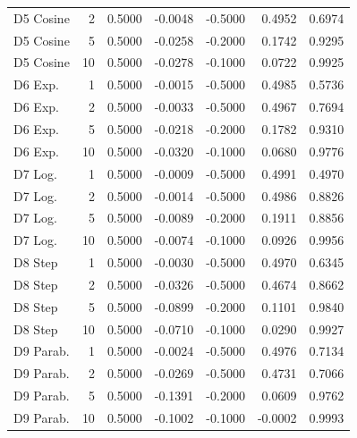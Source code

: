 \begin{tabular}{lrrrrrr}
   D5 Cosine &    2 & 0.5000 &    -0.0048 &       -0.5000 &      0.4952 & 0.6974 \\
   D5 Cosine &    5 & 0.5000 &    -0.0258 &       -0.2000 &      0.1742 & 0.9295 \\
   D5 Cosine &   10 & 0.5000 &    -0.0278 &       -0.1000 &      0.0722 & 0.9925 \\
     D6 Exp. &    1 & 0.5000 &    -0.0015 &       -0.5000 &      0.4985 & 0.5736 \\
     D6 Exp. &    2 & 0.5000 &    -0.0033 &       -0.5000 &      0.4967 & 0.7694 \\
     D6 Exp. &    5 & 0.5000 &    -0.0218 &       -0.2000 &      0.1782 & 0.9310 \\
     D6 Exp. &   10 & 0.5000 &    -0.0320 &       -0.1000 &      0.0680 & 0.9776 \\
     D7 Log. &    1 & 0.5000 &    -0.0009 &       -0.5000 &      0.4991 & 0.4970 \\
     D7 Log. &    2 & 0.5000 &    -0.0014 &       -0.5000 &      0.4986 & 0.8826 \\
     D7 Log. &    5 & 0.5000 &    -0.0089 &       -0.2000 &      0.1911 & 0.8856 \\
     D7 Log. &   10 & 0.5000 &    -0.0074 &       -0.1000 &      0.0926 & 0.9956 \\
     D8 Step &    1 & 0.5000 &    -0.0030 &       -0.5000 &      0.4970 & 0.6345 \\
     D8 Step &    2 & 0.5000 &    -0.0326 &       -0.5000 &      0.4674 & 0.8662 \\
     D8 Step &    5 & 0.5000 &    -0.0899 &       -0.2000 &      0.1101 & 0.9840 \\
     D8 Step &   10 & 0.5000 &    -0.0710 &       -0.1000 &      0.0290 & 0.9927 \\
   D9 Parab. &    1 & 0.5000 &    -0.0024 &       -0.5000 &      0.4976 & 0.7134 \\
   D9 Parab. &    2 & 0.5000 &    -0.0269 &       -0.5000 &      0.4731 & 0.7066 \\
   D9 Parab. &    5 & 0.5000 &    -0.1391 &       -0.2000 &      0.0609 & 0.9762 \\
   D9 Parab. &   10 & 0.5000 &    -0.1002 &       -0.1000 &     -0.0002 & 0.9993 \\
\bottomrule
\end{tabular}
